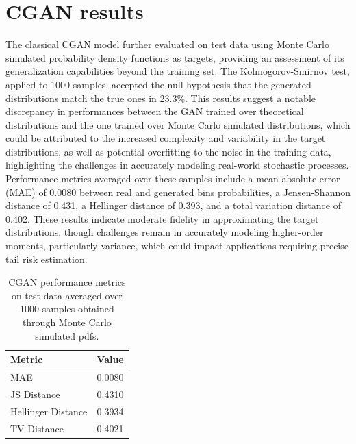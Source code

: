 \section{CGAN results}
The classical CGAN model further evaluated on test data using
Monte Carlo simulated probability density functions as targets,
providing an assessment of its generalization capabilities beyond the training set.
The Kolmogorov-Smirnov test, applied to 1000 samples,
accepted the null hypothesis that the generated distributions
match the true ones in 23.3\%. 
This results suggest a notable discrepancy in performances
between the GAN trained over theoretical distributions and the one trained
over Monte Carlo simulated distributions, which could be attributed to the increased complexity
and variability in the target distributions, as well as potential overfitting to the noise 
in the training data, highlighting the challenges in accurately modeling real-world stochastic processes.
Performance metrics averaged over these samples include a mean absolute error (MAE) of 0.0080 between real and generated bins probabilities, a Jensen-Shannon distance of 0.431, a Hellinger distance of 0.393,
and a total variation distance of 0.402.
These results indicate moderate fidelity in approximating the target distributions, though challenges remain in accurately modeling higher-order moments,
particularly variance, which could impact applications requiring precise tail risk estimation.

\begin{table}[h]
\centering
\begin{tabular}{l c}
\hline
\textbf{Metric} & \textbf{Value} \\
\hline
MAE & 0.0080 \\
JS Distance & 0.4310 \\
Hellinger Distance & 0.3934 \\
TV Distance & 0.4021 \\
\hline
\end{tabular}
\caption{CGAN performance metrics on test data averaged over 1000 samples obtained through Monte Carlo simulated pdfs.}
\end{table}



